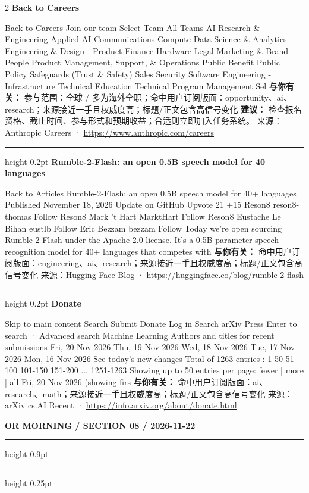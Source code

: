 \documentclass[10.5pt]{ctexart}
\begin{document}
\begin{multicols}{2}
{\large\bfseries Back to Careers}\par
Back to Careers Join our team Select Team All Teams AI Research \& Engineering Applied AI Communications Compute Data Science \& Analytics Engineering \& Design - Product Finance Hardware Legal Marketing \& Brand People Product Management, Support, \& Operations Public Benefit Public Policy Safeguards (Trust \& Safety) Sales Security Software Engineering - Infrastructure Technical Education Technical Program Management Sel
\textbf{与你有关：} 参与范围：全球 / 多为海外全职；命中用户订阅版面：opportunity、ai、research；来源接近一手且权威度高；标题/正文包含高信号变化
\textbf{建议：} 检查报名资格、截止时间、参与形式和预期收益；合适则立即加入任务系统。
{\footnotesize\color{ormuted} 来源：Anthropic Careers · \url{https://www.anthropic.com/careers}}
\vspace{2mm}
\hrule height 0.2pt
\vspace{2mm}
{\large\bfseries Rumble-2-Flash: an open 0.5B speech model for 40+ languages}\par
Back to Articles Rumble-2-Flash: an open 0.5B speech model for 40+ languages Published November 18, 2026 Update on GitHub Upvote 21 +15 Reson8 reson8-thomas Follow Reson8 Mark 't Hart MarktHart Follow Reson8 Eustache Le Bihan eustlb Follow Eric Bezzam bezzam Follow Today we're open sourcing Rumble-2-Flash under the Apache 2.0 license. It's a 0.5B-parameter speech recognition model for 40+ languages that competes with
\textbf{与你有关：} 命中用户订阅版面：engineering、ai、research；来源接近一手且权威度高；标题/正文包含高信号变化
{\footnotesize\color{ormuted} 来源：Hugging Face Blog · \url{https://huggingface.co/blog/rumble-2-flash}}
\vspace{2mm}
\hrule height 0.2pt
\vspace{2mm}
{\large\bfseries Donate}\par
Skip to main content Search Submit Donate Log in Search arXiv Press Enter to search · Advanced search Machine Learning Authors and titles for recent submissions Fri, 20 Nov 2026 Thu, 19 Nov 2026 Wed, 18 Nov 2026 Tue, 17 Nov 2026 Mon, 16 Nov 2026 See today's new changes Total of 1263 entries : 1-50 51-100 101-150 151-200 ... 1251-1263 Showing up to 50 entries per page: fewer | more | all Fri, 20 Nov 2026 (showing firs
\textbf{与你有关：} 命中用户订阅版面：ai、research、math；来源接近一手且权威度高；标题/正文包含高信号变化
{\footnotesize\color{ormuted} 来源：arXiv cs.AI Recent · \url{https://info.arxiv.org/about/donate.html}}
\end{multicols}
\newpage
{\small\bfseries OR MORNING / SECTION 08 / 2026-11-22}
\vspace{2mm}
\hrule height 0.9pt
\vspace{1.5mm}
\hrule height 0.25pt
\vspace{4mm}
\end{document}
